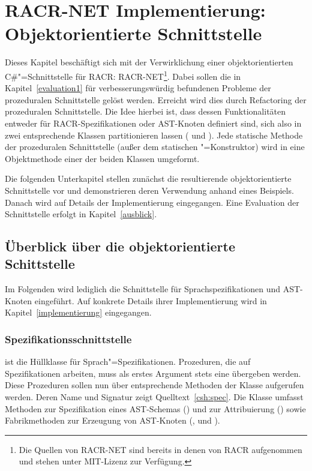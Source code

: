 

\chapter{RACR-NET Implementierung: Objektorientierte Schnittstelle}\label{umsetzung2}

Dieses Kapitel beschäftigt sich mit der Verwirklichung einer objektorientierten C\#"=Schnittstelle für RACR: RACR-NET\footnote{Die Quellen von RACR-NET sind bereits in denen von RACR aufgenommen und stehen unter MIT-Lizenz zur Verfügung.}. Dabei sollen die in Kapitel~\ref{evaluation1} für verbesserungswürdig befundenen Probleme der prozeduralen Schnittstelle gelöst werden. Erreicht wird dies durch Refactoring der prozeduralen Schnittstelle. Die Idee hierbei ist, dass dessen Funktionalitäten entweder für RACR-Spezifikationen oder AST-Knoten definiert sind, sich also in zwei entsprechende Klassen partitionieren lassen ( und ). Jede statische Methode der prozeduralen Schnittstelle (außer dem statischen "=Konstruktor) wird in eine Objektmethode einer der beiden Klassen umgeformt.

Die folgenden Unterkapitel stellen zunächst die resultierende objektorientierte Schnittstelle vor und demonstrieren deren Verwendung anhand eines Beispiels. Danach wird auf Details der Implementierung eingegangen. Eine Evaluation der Schnittstelle erfolgt in Kapitel~\ref{ausblick}.

\section{Überblick über die objektorientierte Schittstelle}

Im Folgenden wird lediglich die Schnittstelle für Sprachspezifikationen und AST-Knoten eingeführt. Auf konkrete Details ihrer Implementierung wird in Kapitel~\ref{implementierung} eingegangen.

\subsection{Spezifikationsschnittstelle}\label{spezifikation}

 ist die Hüllklasse für Sprach"=Spezifikationen. Prozeduren, die auf Spezifikationen arbeiten, muss als erstes Argument stets eine  übergeben werden. Diese Prozeduren sollen nun über entsprechende Methoden der Klasse  aufgerufen werden. Deren Name und Signatur zeigt Quelltext~\ref{csh:spec}. Die Klasse umfasst Methoden zur Spezifikation eines AST-Schemas () und zur Attribuierung () sowie Fabrikmethoden zur Erzeugung von AST-Knoten (,  und ).

